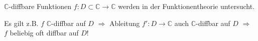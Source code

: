 \begin{hint}
	$\mathbb{C}$-\gls{diffbar}e Funktionen $f:D\subset \mathbb{C}\to\mathbb{C}$ werden in der Funktionentheorie untersucht.
	
	Es gilt z.B. $f$ $\mathbb{C}$-\gls{diffbar} auf $D$ $\Rightarrow$ Ableitung $f':D\to\mathbb{C}$ auch $\mathbb{C}$-\gls{diffbar} auf $D$ $\Rightarrow$ $f$ beliebig oft \gls{diffbar} auf $D$!
\end{hint}